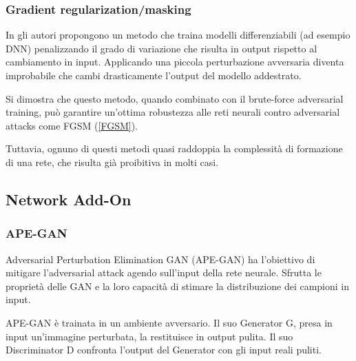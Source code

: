         \subsubsection{Gradient regularization/masking}
        In %
        \cite{ross2017improving} gli autori propongono un metodo che traina modelli differenziabili (ad esempio DNN) penalizzando il grado di variazione che risulta in output rispetto al cambiamento in input. Applicando una piccola perturbazione avversaria diventa improbabile che cambi drasticamente l'output del modello addestrato. 
        
        Si dimostra che questo metodo, quando combinato con il brute-force adversarial training, può garantire un'ottima robustezza alle reti neurali contro adversarial attacks come FGSM (\hyperref[FGSM]{\ref*{FGSM}}). 
        
        Tuttavia, ognuno di questi metodi quasi raddoppia la complessità di formazione di una rete, che risulta già proibitiva in molti casi.
    
    \newpage
    \subsection{Network Add-On}
    
        
        \subsubsection{APE-GAN}
        Adversarial Perturbation Elimination GAN (APE-GAN) %
        \cite{shen2017ape} ha l'obiettivo di mitigare l'adversarial attack agendo sull'input della rete neurale. 
        Sfrutta le proprietà delle GAN e la loro capacità di stimare la distribuzione dei campioni in input.
        
        APE-GAN è trainata in un ambiente avversario. Il suo Generator G, presa in input un'immagine perturbata, la restituisce in output pulita. Il suo Discriminator D confronta l'output del Generator con gli input reali puliti.
        
